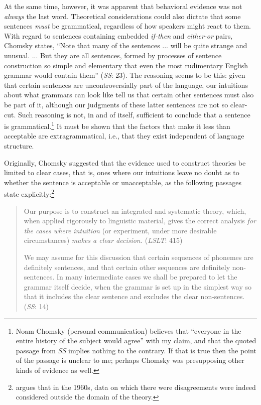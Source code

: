 At the same time, however, it was apparent that behavioral evidence was not \textit{always} the last word. Theoretical considerations could also dictate that some sentences \textit{must} be grammatical, regardless of how speakers might react to them. With regard to sentences containing embedded \textit{if-then} and \textit{either-or} pairs, Chomsky states, ``Note that many of the sentences ... will be quite strange and unusual. ... But they are all  sentences, formed by processes of sentence construction so simple and elementary that even the most rudimentary English grammar would contain them'' (\textit{SS}: 23). The reasoning seems to be this: given that
certain sentences are uncontroversially part of the language, our intuitions about what grammars can look like tell us that certain other sentences must also be part of it, although our judgments of these latter sentences are not so clear-cut. Such reasoning is not, in and of itself, sufficient to conclude that a sentence is grammatical.\footnote{Noam Chomsky (personal communication) believes that ``everyone in the entire history of the subject would agree'' with my claim, and that the quoted passage from \textit{SS} implies nothing to the contrary. If that is true then the point of the passage is unclear to me; perhaps Chomsky was presupposing other kinds of evidence as well.
} It must be shown that the factors that make it less than acceptable are extragrammatical, i.e., that they exist independent of language structure.

Originally, Chomsky suggested that the evidence used to construct theories be limited to clear cases, that is, ones where our intuitions leave no doubt as to whether the sentence is acceptable or unacceptable, as the following passages state explicitly:\footnote{\citet{Carden1973} argues that in the 1960s, data on which there were disagreements were indeed considered outside the domain of the theory.
}
\begin{quote}
Our purpose is to construct an integrated and systematic theory, which, when applied rigorously to linguistic material, gives the correct analysis \textit{for the cases where intuition} (or experiment, under more desirable circumstances) \textit{makes a clear decision.} (\textit{LSLT}: 415)

We may assume for this discussion that certain sequences of phonemes are definitely sentences, and that certain other sequences are definitely non-sentences. In many intermediate cases we shall be prepared to let the grammar itself decide, when the grammar is set up in the simplest way so that it includes the clear sentence and excludes the clear non-sentences. (\textit{SS}: 14)
 \end{quote}
 
